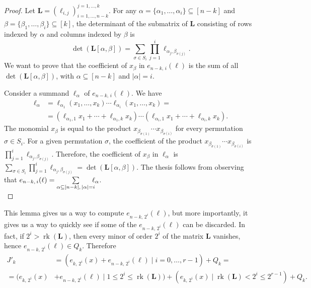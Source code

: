 \documentclass[11pt]{article}
\newcommand{\es}[2]{e_{#1,\, #2}}
\theoremstyle{plain}
\theoremstyle{definition}
\theoremstyle{remark}
\begin{document}
\begin{proof}
    Let $\mathbf{L}=(\ell_{i,j})_{i=1,\dots,n-k}^{j=1,\dots,k}$. For any $\alpha=\{\alpha_1,\dots,\alpha_i\}\subseteq[n-k]$ and $\beta=\{\beta_1,\ldots,\beta_i\}\subseteq [k]$, the determinant of the submatrix of $\mathbf{L}$ consisting of rows indexed by $\alpha$ and columns indexed by $\beta$ is 
    \begin{equation*}
        \operatorname{det}(\mathbf{L}[\alpha,\beta])=\sum_{\sigma\in S_i}\prod_{j=1}^i \ell_{\alpha_j,\beta_{\sigma(j)}}.
    \end{equation*}
    We want to prove that the coefficient of $x_\beta$ in $\es{n-k}{i}(\ell)$ is the sum of all $\operatorname{det}(\mathbf{L}[\alpha,\beta])$, with $\alpha\subseteq [n-k]$ and $|\alpha|=i$.

    Consider a summand $\ell_\alpha$ of $\es{n-k}{i}(\ell)$. We have
    \begin{align*}
        \ell_\alpha
        &=\ell_{\alpha_1}(x_1,\dots,x_k)\cdots\ell_{\alpha_i}(x_1,\dots,x_k)=\\
        &=(\ell_{\alpha_1,1}x_1+\cdots+\ell_{\alpha_1,k}x_k)\cdots(\ell_{\alpha_i,1}x_1+\cdots+\ell_{\alpha_i,k}x_k).
    \end{align*}
    The monomial $x_\beta$ is equal to the product $x_{\beta_{\sigma(1)}}\cdots x_{\beta_{\sigma(i)}}$ for every permutation $\sigma\in S_i$. For a given permutation $\sigma$, the coefficient of the product $x_{\beta_{\sigma(1)}}\cdots x_{\beta_{\sigma(i)}}$ is $\prod\limits_{j=1}^i\ell_{\alpha_j,\beta_{\sigma(j)}}$. Therefore, the coefficient of $x_\beta$ in $\ell_\alpha$ is $\sum\limits_{\sigma\in S_i}\prod\limits_{j=1}^i\ell_{\alpha_j,\beta_{\sigma(j)}}=\operatorname{det}(\mathbf{L}[\alpha,\beta])$. The thesis follows from observing that $\es{n-k}{i}(\ell)=\sum\limits_{\alpha\subseteq [n-k],\,|\alpha|=i}\hspace{-0.2cm}\ell_\alpha$.\\
\end{proof}

This lemma gives us a way to compute $\es{n-k}{2^i}(\ell)$, but more importantly, it gives us a way to quickly see if some of the $\es{n-k}{2^i}(\ell)$ can be discarded. In fact, if $2^i>\operatorname{rk}(\mathbf{L})$, then every minor of order $2^i$ of the matrix $\mathbf{L}$ vanishes, hence $\es{n-k}{2^i}(\ell)\in Q_k$. Therefore
\begin{align*}
    J'_k&=(\es{k}{2^i}(x)+\es{n-k}{2^i}(\ell)\mid i=0,\dots,r-1)+Q_k=\\
    =(\es{k}{2^i}(x)&+\es{n-k}{2^i}(\ell)\mid 1\leq 2^i\leq\operatorname{rk}(\mathbf{L}))+(\es{k}{2^i}(x)\mid \operatorname{rk}(\mathbf{L})<2^i\leq 2^{r-1})+Q_k.
\end{align*}
\end{document}

